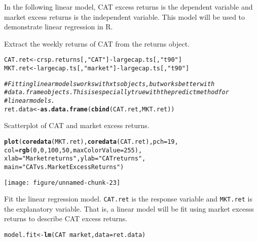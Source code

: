 \documentclass[a4paper]{article}\usepackage[]{graphicx}\usepackage[]{color}
\makeatletter
\def\maxwidth{ %
  \ifdim\Gin@nat@width>\linewidth
    \linewidth
  \else
    \Gin@nat@width
  \fi
}
\newcommand{\hlstr}[1]{\textcolor[rgb]{0.192,0.494,0.8}{#1}}%
\newcommand{\hlcom}[1]{\textcolor[rgb]{0.678,0.584,0.686}{\textit{#1}}}%
\newcommand{\hlkwd}[1]{\textcolor[rgb]{0.737,0.353,0.396}{\textbf{#1}}}%
\newenvironment{kframe}{%
 \def\at@end@of@kframe{}%
 \ifinner\ifhmode%
  \def\at@end@of@kframe{\end{minipage}}%
  \begin{minipage}{\columnwidth}%
 \fi\fi%
 \def\FrameCommand##1{\hskip\@totalleftmargin \hskip-\fboxsep
 \colorbox{shadecolor}{##1}\hskip-\fboxsep
     \hskip-\linewidth \hskip-\@totalleftmargin \hskip\columnwidth}%
 \MakeFramed {\advance\hsize-\width
   \@totalleftmargin\z@ \linewidth\hsize
   \@setminipage}}%
 {\par\unskip\endMakeFramed%
 \at@end@of@kframe}
\newenvironment{knitrout}{}{} %
\makeatother
\begin{document}
In the following linear model, CAT excess returns is the dependent variable and market excess returns is the independent variable. This model will be used to demonstrate linear regression in R.

Extract the weekly returns of CAT from the returns object.
\begin{knitrout}
\color{fgcolor}\begin{kframe}
\begin{alltt}
CAT.ret <- crsp.returns[, \hlstr{"CAT"}] - largecap.ts[, \hlstr{"t90"}]
MKT.ret <- largecap.ts[, \hlstr{"market"}] - largecap.ts[, \hlstr{"t90"}]

\hlcom{# Fitting linear models works with xts objects, but works better with}
\hlcom{# data.frame objects. This is especially true with the predict method for}
\hlcom{# linear models.}
ret.data <- \hlkwd{as.data.frame}(\hlkwd{cbind}(CAT.ret, MKT.ret))
\end{alltt}
\end{kframe}
\end{knitrout}


Scatterplot of CAT and market excess returns.
\begin{knitrout}
\color{fgcolor}\begin{kframe}
\begin{alltt}
\hlkwd{plot}(\hlkwd{coredata}(MKT.ret), \hlkwd{coredata}(CAT.ret), pch=19,
     col=\hlkwd{rgb}(0,0,100,50,maxColorValue=255),
     xlab=\hlstr{"Market returns"}, ylab=\hlstr{"CAT returns"},
     main=\hlstr{"CAT vs. Market Excess Returns"})
\end{alltt}
\end{kframe}
\texttt{[image: figure/unnamed-chunk-23]} 

\end{knitrout}


Fit the linear regression model. \verb"CAT.ret" is the response variable and \verb"MKT.ret" is the explanatory variable. That is, a linear model will be fit using market excesss returns to describe CAT excess returns.
\begin{knitrout}
\color{fgcolor}\begin{kframe}
\begin{alltt}
model.fit <- \hlkwd{lm}(CAT ~ market, data = ret.data)
\end{alltt}
\end{kframe}
\end{knitrout}
\end{document}
